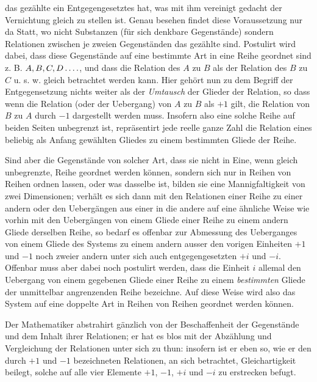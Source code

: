 %
das gezählte ein Entgegengesetztes hat, was mit ihm vereinigt gedacht der Vernichtung gleich zu stellen ist. Genau besehen findet diese Voraussetzung nur da Statt, wo nicht Substanzen (für sich denkbare Gegenstände) sondern Relationen zwischen je zweien Gegenständen das gezählte sind. Postulirt wird dabei, dass diese Gegenstände auf eine bestimmte Art in eine Reihe geordnet sind z. B. $A,B,C,D\mathinner{.\,.\,.\,.}$, und dass die Relation des $A$ zu $B$ als der Relation des $B$ zu $C$ u. s. w. gleich betrachtet werden kann. Hier gehört nun zu dem Begriff der Entgegensetzung nichts weiter als der \emph{Umtausch} der Glieder der Relation, so dass wenn die Relation (oder der Uebergang) von $A$ zu $B$ als $+1$ gilt, die Relation von $B$ zu $A$ durch $-1$ dargestellt werden muss. Insofern also eine solche Reihe auf beiden Seiten unbegrenzt ist, repräsentirt jede reelle ganze Zahl die Relation eines beliebig als Anfang gewählten Gliedes zu einem bestimmten Gliede der Reihe.

Sind aber die Gegenstände von solcher Art, dass sie nicht in Eine, wenn gleich unbegrenzte, Reihe geordnet werden können, sondern sich nur in Reihen von Reihen ordnen lassen, oder was dasselbe ist, bilden sie eine Mannigfaltigkeit von zwei Dimensionen; verhält es sich dann mit den Relationen einer Reihe zu einer andern oder den Uebergängen aus einer in die andere auf eine ähnliche Weise wie vorhin mit den Uebergängen von einem Gliede einer Reihe zu einem andern Gliede derselben Reihe, so bedarf es offenbar zur Abmessung des Ueberganges von einem Gliede des Systems zu einem andern ausser den vorigen Einheiten $+1$ und $-1$ noch zweier andern unter sich auch entgegengesetzten $+i$ und $-i$. Offenbar muss aber dabei noch postulirt werden, dass die Einheit $i$ allemal den Uebergang von einem gegebenen Gliede einer Reihe zu einem \emph{bestimmten} Gliede der unmittelbar angrenzenden Reihe bezeichne. Auf diese Weise wird also das System auf eine doppelte Art in Reihen von Reihen geordnet werden können.

Der Mathematiker abstrahirt gänzlich von der Beschaffenheit der Gegenstände und dem Inhalt ihrer Relationen; er hat es blos mit der Abzählung und Vergleichung der Relationen unter sich zu thun: insofern ist er eben so, wie er den durch $+1$ und $-1$ bezeichneten Relationen, an sich betrachtet, Gleichartigkeit beilegt, solche auf alle vier Elemente $+1$, $-1$, $+i$ und $-i$ zu erstrecken befugt.

